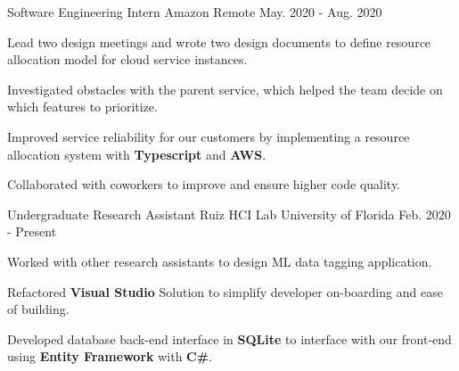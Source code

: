 


\begin{cventries}

	
		\cventry
	{Software Engineering Intern} %
	{Amazon} %
	{Remote} %
	{May. 2020 - Aug. 2020} %
	{ %
		\begin{cvitems}
			\setlength{\itemindent}{.125in}
			\item {Lead two design meetings and wrote two design documents to define resource allocation model for cloud service instances.}
			\item {Investigated obstacles with the parent service, which helped the team decide on which features to prioritize.}
			\item {Improved service reliability for our customers by implementing a resource allocation system with \textbf{Typescript} and \textbf{AWS}. }
			\item {Collaborated with coworkers to improve and ensure higher code quality.}
		\end{cvitems}
	}
	
	
			\cventry
	{Undergraduate Research Assistant} %
	{Ruiz HCI Lab} %
	{University of Florida} %
	{Feb. 2020 - Present} %
	{ %
		\begin{cvitems}
			\setlength{\itemindent}{.125in}
			\item {Worked with other research assistants to design ML data tagging application.}
			\item {Refactored \textbf{Visual Studio} Solution to simplify  developer on-boarding and ease of building.}
			\item {Developed  database back-end interface in \textbf{SQLite} to interface with our front-end using \textbf{Entity Framework} with \textbf{C\#}.}
		\end{cvitems}
	}
	

\end{cventries}
